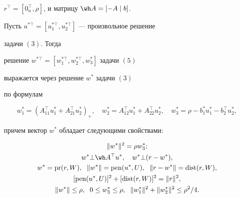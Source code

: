 $r^\top=[0^\top_n,\rho]$, и матрицу $\wh A=[-A\mid b]$.





\begin{thm}


Пусть $u^{*\top}=[u^{*\top}_1,u^{*\top}_2]$ --- произвольное решение 


задачи $(3)$. Тогда


решение $w^{*\top}=[w^{*\top}_1,w^{*\top}_2,w^*_3]$ задачи $(5)$ 


выражается через решение $w^*$ задачи $(3)$


по формулам


\begin{equation}


w^*_1=(A^\top_{11}u^*_1+A^\top_{21}u^*_2)_+,\quad


w^*_2=A^\top_{12}u^*_1+A^\top_{22}u^*_2,\quad


w^*_3=\rho-b^*_1u^*_1-b^\top_2u^*_2,


\end{equation}


причем вектор $w^*$ обладает следующими свойствами$:$


\begin{gather}


\|w^*\|^2=\rho w^*_3; \\


%


w^*\bot \wh A^\top u^*,\quad w^*\bot(r-w^*),\\


%


w^*=\pr(r,W),\ \; \|w^*\|=\pen(u^*,U),


\ \; \|r-w^*\|=\dist(r,W), \\


[\pen(u^*,U)]^2+[\dist(r,W)]^2=\|r\|^2,\\


%


\|w^*\|\le\rho,\ \; 0\le w^*_3\le\rho,


\ \; \|w^*_1\|^2+\|w^*_2\|^2\le\rho^2/4.


\end{gather}


\end{thm}





